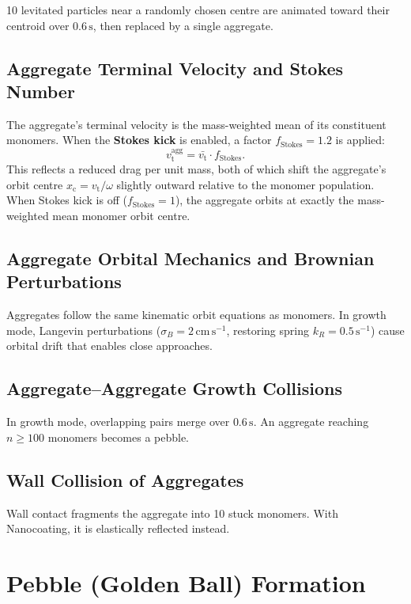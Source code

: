 \documentclass[12pt, a4paper]{article}
\newcommand{\vt}{v_{\mathrm{t}}}
\newcommand{\xc}{x_{\mathrm{c}}}
\newcommand{\omg}{\omega}
\begin{document}
10 levitated particles near a randomly chosen centre are animated toward
their centroid over $0.6\,\mathrm{s}$, then replaced by a single aggregate.

\subsection{Aggregate Terminal Velocity and Stokes Number}

The aggregate's terminal velocity is the mass-weighted mean of its constituent
monomers. When the \textbf{Stokes kick} is enabled, a factor
$f_{\mathrm{Stokes}} = 1.2$ is applied:
\begin{equation}
  \vt^{\mathrm{agg}} = \bar{\vt} \cdot f_{\mathrm{Stokes}}.
\end{equation}
This reflects a reduced  drag per unit mass, both of which shift
the aggregate's orbit centre $\xc = \vt/\omg$ slightly outward relative to
the monomer population. When Stokes kick is off ($f_{\mathrm{Stokes}} = 1$),
the aggregate orbits at exactly the mass-weighted mean monomer orbit centre.

\subsection{Aggregate Orbital Mechanics and Brownian Perturbations}

Aggregates follow the same kinematic orbit equations as monomers.
In growth mode, Langevin perturbations ($\sigma_B = 2\,\mathrm{cm\,s^{-1}}$,
restoring spring $k_R = 0.5\,\mathrm{s}^{-1}$) cause orbital drift that
enables close approaches.

\subsection{Aggregate--Aggregate Growth Collisions}

In growth mode, overlapping pairs merge over $0.6\,\mathrm{s}$. An aggregate
reaching $n \geq 100$ monomers becomes a pebble.

\subsection{Wall Collision of Aggregates}

Wall contact fragments the aggregate into 10 stuck monomers. With Nanocoating,
it is elastically reflected instead.

\section{Pebble (Golden Ball) Formation}
\end{document}
